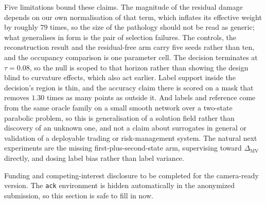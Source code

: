 \documentclass{article}
\begin{document}
Five limitations bound these claims. The magnitude of the residual damage depends on
our own normalisation of that term, which inflates its effective weight by roughly
$79$ times, so the size of the pathology should not be read as generic; what
generalises in form is the pair of selection failures. The controls, the
reconstruction result and the residual-free arm carry five seeds rather than ten,
and the occupancy comparison is one parameter cell. The decision terminates at
$\tau = 0.08$, so the null is scoped to that horizon rather than showing the design
blind to curvature effects, which also act earlier. Label support inside the
decision's region is thin, and the accuracy claim there is scored on a mask that
removes $1.30$ times as many points as outside it. And labels and reference come
from the same oracle family on a small smooth network over a two-state parabolic
problem, so this is generalisation of a solution field rather than discovery of an
unknown one, and not a claim about surrogates in general or validation of a
deployable trading or risk-management system. The natural next
experiments are the missing first-plus-second-state arm, supervising toward
$\Delta_{\mathrm{MV}}$ directly, and dosing label bias rather than label variance.

\begin{ack}
Funding and competing-interest disclosure to be completed for the camera-ready
version. The \texttt{ack} environment is hidden automatically in the anonymized
submission, so this section is safe to fill in now.
\end{ack}
\end{document}
